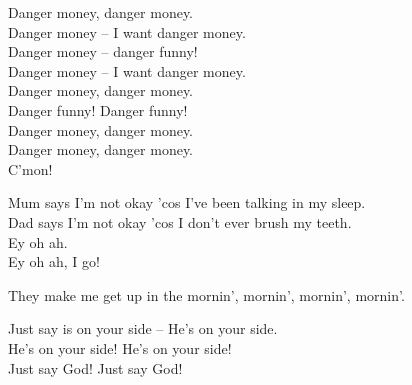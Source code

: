 \begin{specialChapterEnvironment}


\label{ep:willoughbys-beach}




Danger money, danger money. \\
Danger money -- I want danger money. \\
Danger money -- danger funny! \\
Danger money -- I want danger money. \\

Danger money, danger money. \\
Danger funny! Danger funny! \\
Danger money, danger money. \\
Danger money, danger money. \\
C'mon! \\




Mum says I'm not okay 'cos I've been talking in my sleep. \\
Dad says I'm not okay 'cos I don't ever brush my teeth. \\

Ey oh ah. \\
Ey oh ah, I go! \\




They make me get up in the mornin', mornin', mornin', mornin'. \\




Just say  is on your side -- He's on your side. \\
He's on your side! He's on your side! \\
Just say God! Just say God! \\


\end{specialChapterEnvironment}
